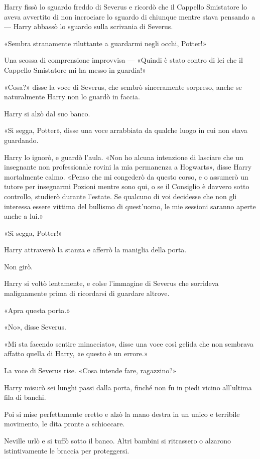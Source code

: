 Harry fissò lo sguardo freddo di Severus e ricordò che il Cappello Smistatore lo aveva avvertito di non incrociare lo sguardo di chiunque mentre stava pensando a — Harry abbassò lo sguardo sulla scrivania di Severus.

«Sembra stranamente riluttante a guardarmi negli occhi, Potter!»

Una scossa di comprensione improvvisa — «Quindi è stato contro di lei che il Cappello Smistatore mi ha messo in guardia!»

«Cosa?» disse la voce di Severus, che sembrò sinceramente sorpreso, anche se naturalmente Harry non lo guardò in faccia.

Harry si alzò dal suo banco.

«Si segga, Potter», disse una voce arrabbiata da qualche luogo in cui non stava guardando.

Harry lo ignorò, e guardò l’aula. «Non ho alcuna intenzione di lasciare che un insegnante non professionale rovini la mia permanenza a Hogwarts», disse Harry mortalmente calmo. «Penso che mi congederò da questo corso, e o assumerò un tutore per insegnarmi Pozioni mentre sono qui, o se il Consiglio è davvero sotto controllo, studierò durante l’estate. Se qualcuno di voi decidesse che non gli interessa essere vittima del bullismo di quest’uomo, le mie sessioni saranno aperte anche a lui.»

«Si segga, Potter!»

Harry attraversò la stanza e afferrò la maniglia della porta.

Non girò.

Harry si voltò lentamente, e colse l’immagine di Severus che sorrideva malignamente prima di ricordarsi di guardare altrove.

«Apra questa porta.»

«No», disse Severus.

«Mi sta facendo sentire minacciato», disse una voce così gelida che non sembrava affatto quella di Harry, «e questo è un errore.»

La voce di Severus rise. «Cosa intende fare, ragazzino?»

Harry misurò sei lunghi passi dalla porta, finché non fu in piedi vicino all’ultima fila di banchi.

Poi si mise perfettamente eretto e alzò la mano destra in un unico e terribile movimento, le dita pronte a schioccare.

Neville urlò e si tuffò sotto il banco. Altri bambini si ritrassero o alzarono istintivamente le braccia per proteggersi.

